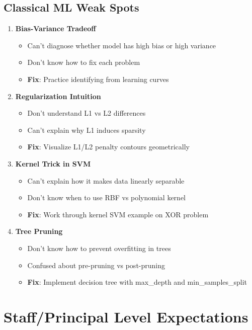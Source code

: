 \documentclass[10pt]{article}
\begin{document}
\subsection{Classical ML Weak Spots}
\begin{enumerate}
\item \textbf{Bias-Variance Tradeoff}
\begin{itemize}
\item Can't diagnose whether model has high bias or high variance
\item Don't know how to fix each problem
\item \textbf{Fix}: Practice identifying from learning curves
\end{itemize}

\item \textbf{Regularization Intuition}
\begin{itemize}
\item Don't understand L1 vs L2 differences
\item Can't explain why L1 induces sparsity
\item \textbf{Fix}: Visualize L1/L2 penalty contours geometrically
\end{itemize}

\item \textbf{Kernel Trick in SVM}
\begin{itemize}
\item Can't explain how it makes data linearly separable
\item Don't know when to use RBF vs polynomial kernel
\item \textbf{Fix}: Work through kernel SVM example on XOR problem
\end{itemize}

\item \textbf{Tree Pruning}
\begin{itemize}
\item Don't know how to prevent overfitting in trees
\item Confused about pre-pruning vs post-pruning
\item \textbf{Fix}: Implement decision tree with max\_depth and min\_samples\_split
\end{itemize}
\end{enumerate}

\section{Staff/Principal Level Expectations}
\end{document}

